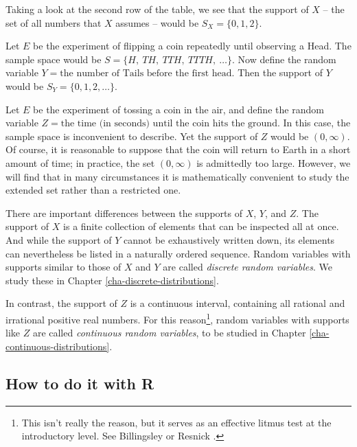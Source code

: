 \documentclass[]{book}
\let\rmarkdownfootnote\footnote%
\def\footnote{\protect\rmarkdownfootnote}
\numberwithin{equation}{chapter}
\numberwithin{figure}{chapter}
\theoremstyle{plain}
\theoremstyle{definition}
\theoremstyle{remark}
\theoremstyle{definition}
\theoremstyle{definition}
\theoremstyle{remark}
\let\BeginKnitrBlock\begin \let\EndKnitrBlock\end
\begin{document}
Taking a look at the second row of the table, we see that the support of
\(X\) -- the set of all numbers that \(X\) assumes -- would be
\(S_{X}= \{ 0,1,2 \}\).

\bigskip

\BeginKnitrBlock{example}
\protect\hypertarget{ex:unnamed-chunk-185}{}{\label{ex:unnamed-chunk-185}}Let
\(E\) be the experiment of flipping a coin repeatedly until observing a
Head. The sample space would be \(S= \{ H,\ TH,\ TTH,\
TTTH,\ \ldots \}\). Now define the random variable
\(Y=\mbox{the number of Tails before the first head}\). Then the support
of \(Y\) would be \(S_{Y}= \{ 0,1,2,\ldots \}\).
\EndKnitrBlock{example}

\bigskip

\BeginKnitrBlock{example}
\protect\hypertarget{ex:unnamed-chunk-186}{}{\label{ex:unnamed-chunk-186}}Let
\(E\) be the experiment of tossing a coin in the air, and define the
random variable
\(Z = \mbox{the time (in seconds) until the coin hits the ground}\). In
this case, the sample space is inconvenient to describe. Yet the support
of \(Z\) would be \((0,\infty)\). Of course, it is reasonable to suppose
that the coin will return to Earth in a short amount of time; in
practice, the set \((0,\infty)\) is admittedly too large. However, we
will find that in many circumstances it is mathematically convenient to
study the extended set rather than a restricted one.
\EndKnitrBlock{example}

There are important differences between the supports of \(X\), \(Y\),
and \(Z\). The support of \(X\) is a finite collection of elements that
can be inspected all at once. And while the support of \(Y\) cannot be
exhaustively written down, its elements can nevertheless be listed in a
naturally ordered sequence. Random variables with supports similar to
those of \(X\) and \(Y\) are called \emph{discrete random variables}. We
study these in Chapter \ref{cha-discrete-distributions}.

In contrast, the support of \(Z\) is a continuous interval, containing
all rational and irrational positive real numbers. For this
reason\footnote{This isn't really the reason, but it serves as an
  effective litmus test at the introductory level. See Billingsley
  \autocite{Billingsley1995} or Resnick \autocite{Resnick1999}.}, random
variables with supports like \(Z\) are called \emph{continuous random
variables}, to be studied in Chapter \ref{cha-continuous-distributions}.

\subsection{How to do it with R}\label{how-to-do-it-with-r-19}
\end{document}
